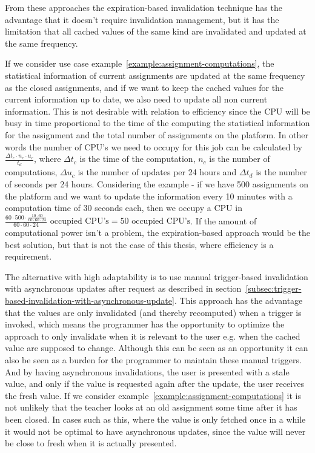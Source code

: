 From these approaches the expiration-based invalidation technique has the advantage that it doesn't require invalidation management, but it has the limitation that all cached values of the same kind are invalidated and updated at the same frequency.

If we consider use case example~\ref{example:assignment-computations}, the statistical information of current assignments are updated at the same frequency as the closed assignments, and if we want to keep the cached values for the current information up to date, we also need to update all non current information. This is not desirable with relation to efficiency since the CPU will be busy in time proportional to the time of the computing the statistical information for the assignment and the total number of assignments on the platform. In other words the number of CPU's we need to occupy for this job can be calculated by $\frac{\Delta t_c \cdot n_c \cdot u_c}{t_d}$, where $\Delta t_c$ is the time of the computation, $n_c$ is the number of computations, $\Delta u_c$ is the number of updates per 24 hours and $\Delta t_d$ is the number of seconds per 24 hours. Considering the example - if we have 500 assignments on the platform and we want to update the information every 10 minutes with a computation time of 30 seconds each, then we occupy a CPU in $\frac{60 \cdot 500 \cdot \frac{10 \cdot 60}{60 \cdot 60 \cdot 24}}{60 \cdot 60 \cdot 24}\text{ occupied CPU's} = 50\text{ occupied CPU's}$. If the amount of computational power isn't a problem, the expiration-based approach would be the best solution, but that is not the case of this thesis, where efficiency is a requirement.

The alternative with high adaptability is to use manual trigger-based invalidation with asynchronous updates after request as described in section~\ref{subsec:trigger-based-invalidation-with-asynchronous-update}. This approach has the advantage that the values are only invalidated (and thereby recomputed) when a trigger is invoked, which means the programmer has the opportunity to optimize the approach to only invalidate when it is relevant to the user e.g. when the cached value are supposed to change. Although this can be seen as an opportunity it can also be seen as a burden for the programmer to maintain these manual triggers. And by having asynchronous invalidations, the user is presented with a stale value, and only if the value is requested again after the update, the user receives the fresh value. If we consider example~\ref{example:assignment-computations} it is not unlikely that the teacher looks at an old assignment some time after it has been closed. In cases such as this, where the value is only fetched once in a while it would not be optimal to have asynchronous updates, since the value will never be close to fresh when it is actually presented.

